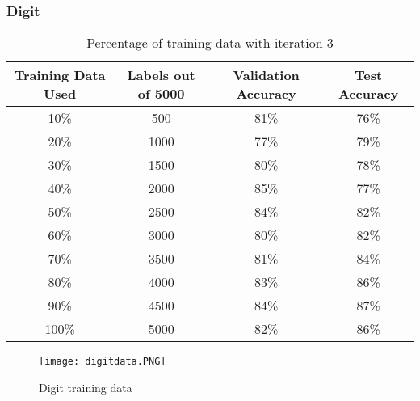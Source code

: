 \documentclass{article}
\begin{document}
        \subsubsection{Digit}
            \begin{table}[h]
                \centering
                \begin{tabular}{c|c|c|c}
                    \hline
                        Training Data Used & Labels out of 5000 & Validation Accuracy & Test Accuracy \\
                    \hline
                        10\% & 500 & 81\% & 76\%\\
                    \hline
                        20\% & 1000 & 77\% & 79\%\\
                    \hline
                        30\% & 1500 & 80\% & 78\%\\
                    \hline
                        40\% & 2000 & 85\% & 77\%\\
                    \hline
                        50\% & 2500 & 84\% & 82\%\\
                    \hline
                        60\% & 3000 & 80\% & 82\%\\
                    \hline
                        70\% & 3500 & 81\% & 84\%\\
                    \hline
                        80\% & 4000 & 83\% & 86\%\\
                    \hline
                        90\% & 4500 & 84\% & 87\%\\
                    \hline
                        100\% & 5000 & 82\% & 86\%\\
                    \hline
                \end{tabular}
                \caption{Percentage of training data with iteration 3}
            \end{table}
            \newpage
            \begin{figure}[h]
                \centering
                    \texttt{[image: digitdata.PNG]}
                \caption{Digit training data}
            \end{figure}
        
\end{document}
